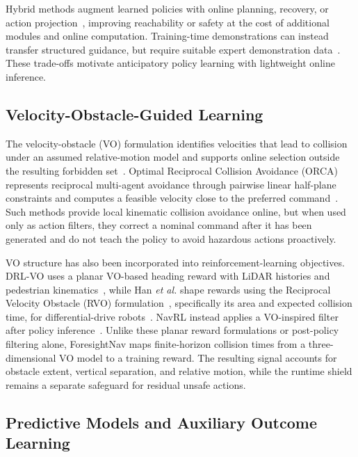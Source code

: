 \documentclass[letterpaper, 10 pt, conference]{ieeeconf}
\begin{document}
Hybrid methods augment learned policies with online planning, recovery, or action projection~\cite{prm_rl,thananjeyan2021recovery,kochdumper2023projection}, improving reachability or safety at the cost of additional modules and online computation. Training-time demonstrations can instead transfer structured guidance, but require suitable expert demonstration data~\cite{he2020demonstration}. These trade-offs motivate anticipatory policy learning with lightweight online inference.

\subsection{Velocity-Obstacle-Guided Learning}

The velocity-obstacle (VO) formulation identifies velocities that lead to collision under an assumed relative-motion model and supports online selection outside the resulting forbidden set~\cite{fiorini1998vo}. Optimal Reciprocal Collision Avoidance (ORCA) represents reciprocal multi-agent avoidance through pairwise linear half-plane constraints and computes a feasible velocity close to the preferred command~\cite{orca}. Such methods provide local kinematic collision avoidance online, but when used only as action filters, they correct a nominal command after it has been generated and do not teach the policy to avoid hazardous actions proactively.

VO structure has also been incorporated into reinforcement-learning objectives. DRL-VO uses a planar VO-based heading reward with LiDAR histories and pedestrian kinematics~\cite{drl_vo}, while Han \emph{et al.} shape rewards using the Reciprocal Velocity Obstacle (RVO) formulation~\cite{rvo2008}, specifically its area and expected collision time, for differential-drive robots~\cite{han2022rvo}. NavRL instead applies a VO-inspired filter after policy inference~\cite{navrl}. Unlike these planar reward formulations or post-policy filtering alone, ForesightNav maps finite-horizon collision times from a three-dimensional VO model to a training reward. The resulting signal accounts for obstacle extent, vertical separation, and relative motion, while the runtime shield remains a separate safeguard for residual unsafe actions.

\subsection{Predictive Models and Auxiliary Outcome Learning}
\end{document}

